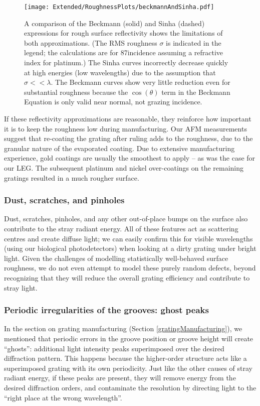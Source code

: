 \begin{figure}[htbp] %
   \centering
   \texttt{[image: Extended/RoughnessPlots/beckmannAndSinha.pdf]} 
   \caption[A comparison of the Beckmann (solid) and Sinha (dashed) expressions for rough surface reflectivity shows the limitations of both approximations.]{A comparison of the Beckmann (solid) and Sinha (dashed) expressions for rough surface reflectivity shows the limitations of both approximations.  (The RMS roughness $\sigma$ is indicated in the legend; the calculations are for 87\dg incidence assuming a refractive index for platinum.)  The Sinha curves incorrectly decrease quickly at high energies (low wavelengths) due to the assumption that $\sigma << \lambda$.  The Beckmann curves show very little reduction even for substantial roughness because the $\cos(\theta)$ term in the Beckmann Equation is only valid near normal, not grazing incidence.}
   \label{beckmannAndSinha}
\end{figure}

If these reflectivity approximations are reasonable, they reinforce how important it is to keep the roughness low during manufacturing.  Our AFM measurements suggest that re-coating the grating after ruling adds to the roughness, due to the granular nature of the evaporated coating.  Due to extensive manufacturing experience, gold coatings are usually the smoothest to apply -- as was the case for our LEG.  The subsequent platinum and nickel over-coatings on the remaining gratings resulted in a much rougher surface.

\subsubsection{Dust, scratches, and pinholes}
Dust, scratches, pinholes, and any other out-of-place bumps on the surface also contribute to the stray radiant energy.  All of these features act as scattering centres and create diffuse light; we can easily confirm this for visible wavelengths (using our biological photodetectors) when looking at a dirty grating under bright light.  Given the challenges of modelling statistically well-behaved surface roughness, we do not even attempt to model these purely random defects, beyond recognizing that they will reduce the overall grating efficiency and contribute to stray light.

\subsubsection{Periodic irregularities of the grooves: ghost peaks}
In the section on grating manufacturing (Section \ref{gratingManufacturing}), we mentioned that periodic errors in the groove position or groove height will create ``ghosts'': additional light intensity peaks superimposed over the desired diffraction pattern.  This happens because the higher-order structure acts like a superimposed grating with its own periodicity.  Just like the other causes of stray radiant energy, if these peaks are present, they will remove energy from the desired diffraction orders, and contaminate the resolution by directing light to the ``right place at the wrong wavelength''.

